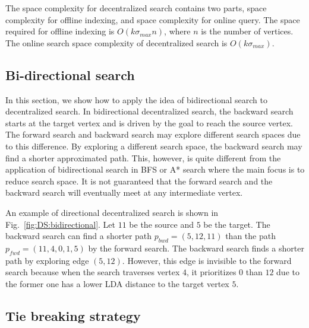 The space complexity for decentralized search contains two parts, space complexity for offline indexing, and space complexity for online query. The space required for offline indexing is $O(k{\sigma}_{max}n)$, where $n$ is the number of vertices. 
The online search space complexity of decentralized search is $O(k{\sigma}_{max})$.

\subsection{Bi-directional search}

In this section, we show how to apply the idea of bidirectional search to decentralized search. In bidirectional decentralized search, the backward search starts at the target vertex and is driven by the goal to reach the source vertex. The forward search and backward search may explore different search spaces due to this difference. By exploring a different search space, the backward search may find a shorter approximated path. This, however, is quite different from the application of bidirectional search in BFS or A* search where the main focus is to reduce search space. It is not guaranteed that the forward search and the backward search will eventually meet at any intermediate vertex. 

An example of directional decentralized search is shown in Fig.~\ref{fig:DS:bidirectional}. Let $11$ be the source and $5$ be the target. The backward search can find a shorter path $p_{bwd} = (5, 12, 11)$ than the path $p_{fwd} = (11, 4, 0, 1, 5)$ by the forward search. The backward search finds a shorter path by exploring edge $(5, 12)$. However, this edge is invisible to the forward search because when the search traverses vertex $4$, it prioritizes $0$ than $12$ due to the former one has a lower LDA distance to the target vertex $5$.


\subsection{Tie breaking strategy}

